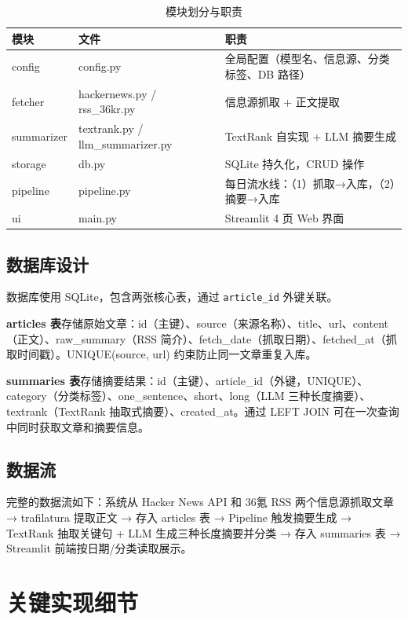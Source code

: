 \documentclass[12pt,a4paper]{ctexart}
\begin{document}
\begin{table}[H]
\centering
\caption{模块划分与职责}
\label{tab:modules}
\small
\begin{tabular}{lll}
\toprule
\textbf{模块} & \textbf{文件} & \textbf{职责} \\
\midrule
config    & config.py           & 全局配置（模型名、信息源、分类标签、DB 路径） \\
fetcher   & hackernews.py / rss\_36kr.py & 信息源抓取 + 正文提取 \\
summarizer & textrank.py / llm\_summarizer.py & TextRank 自实现 + LLM 摘要生成 \\
storage   & db.py               & SQLite 持久化，CRUD 操作 \\
pipeline  & pipeline.py         & 每日流水线：（1）抓取→入库，（2）摘要→入库 \\
ui        & main.py             & Streamlit 4 页 Web 界面 \\
\bottomrule
\end{tabular}
\end{table}

\subsection{数据库设计}

数据库使用 SQLite，包含两张核心表，通过 \texttt{article\_id} 外键关联。

\textbf{articles 表}存储原始文章：id（主键）、source（来源名称）、title、url、content（正文）、raw\_summary（RSS 简介）、fetch\_date（抓取日期）、fetched\_at（抓取时间戳）。UNIQUE(source, url) 约束防止同一文章重复入库。

\textbf{summaries 表}存储摘要结果：id（主键）、article\_id（外键，UNIQUE）、category（分类标签）、one\_sentence、short、long（LLM 三种长度摘要）、textrank（TextRank 抽取式摘要）、created\_at。通过 LEFT JOIN 可在一次查询中同时获取文章和摘要信息。

\subsection{数据流}

完整的数据流如下：系统从 Hacker News API 和 36氪 RSS 两个信息源抓取文章 → trafilatura 提取正文 → 存入 articles 表 → Pipeline 触发摘要生成 → TextRank 抽取关键句 + LLM 生成三种长度摘要并分类 → 存入 summaries 表 → Streamlit 前端按日期/分类读取展示。

\section{关键实现细节}
\end{document}
